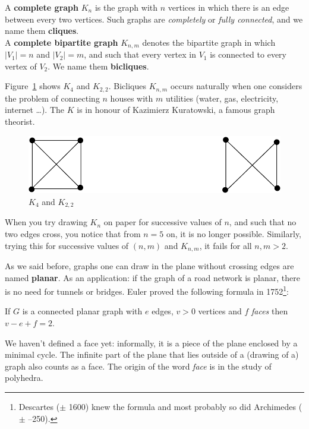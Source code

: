 \begin{definition}
  \textup{A \textbf{complete graph} $K_n$ is the graph with $n$ vertices in which there is an edge
between every two vertices. Such graphs are {\em completely} or {\em fully connected}, and we name them \textbf{cliques}.\\
  A \textbf{complete bipartite graph} $K_{n,m}$ denotes the bipartite graph in which $|V_{1}| = n$ and $|V_{2}| = m$, and such that every vertex in $V_{1}$ is connected to every vertex of $V_{2}$. We name them \textbf{bicliques}.}
\end{definition}

Figure~\ref{kuratowski1} shows $K_{4}$ and $K_{2,2}$. Bicliques $K_{n,m}$ occurs naturally when one considers
the problem of connecting $n$ houses with $m$ utilities (water, gas,
electricity, internet \ldots). The $K$ is in honour of Kazimierz Kuratowski, a famous graph theorist.

\begin{figure}[ht]
	\centering
	\includegraphics[width=0.4\linewidth,keepaspectratio]{kuratowski1}
	\caption{$K_{4}$ and $K_{2,2}$ \label{kuratowski1}}
\end{figure}

When you try drawing $K_{n}$ on paper for successive values of $n$,
and such that no two edges cross, you notice that from $n=5$ on, it is
no longer possible. Similarly, trying this for successive values of
$(n,m)$ and $K_{n,m}$, it fails for all $n,m > 2$.

As we said before, graphs one can draw in the plane without crossing
edges are named \textbf{planar}. As an application: if the graph of a
road network is planar, there is no need for tunnels or bridges. Euler
proved the following formula in 1752\footnote{Descartes
($\pm$ 1600) knew the formula and most probably so did Archimedes
($\pm$ --250).}:

 \begin{theorem}
If $G$ is a connected planar graph with $e$ edges, $v > 0$ vertices and
$f$ {\em faces} then $v-e+f = 2$.
\end{theorem}

We haven't defined a face yet: informally, it is a piece of the plane
enclosed by a minimal cycle. The infinite part of the plane
that lies outside of a (drawing of a) graph also counts as a face. The
origin of the word {\em face} is in the study of polyhedra.


